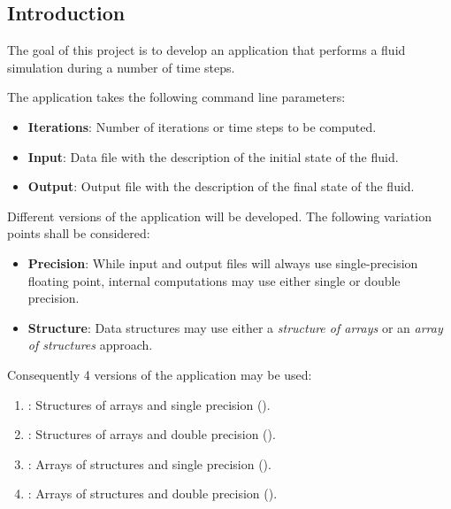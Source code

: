 \subsection{Introduction}

The goal of this project is to develop an application that performs a fluid
simulation during a number of time steps.

The application takes the following command line parameters:
\begin{itemize}
\item \textbf{Iterations}: Number of iterations or time steps to be computed.
\item \textbf{Input}: Data file with the description of the initial state of the
fluid.
\item \textbf{Output}: Output file with the description of the final state of
the fluid.
\end{itemize}

Different versions of the application will be developed. The following variation
points shall be considered:

\begin{itemize}

\item \textbf{Precision}: While input and output files will always use
single-precision floating point, internal computations may use either single or
double precision.

\item \textbf{Structure}: Data structures may use either a \emph{structure of
arrays} or an \emph{array of structures} approach.

\end{itemize}

Consequently 4 versions of the application may be used:
\begin{enumerate}
\item {}: Structures of arrays and single precision ().
\item {}: Structures of arrays and double precision ().
\item {}: Arrays of structures and single precision ().
\item {}: Arrays of structures and double precision ().
\end{enumerate}
